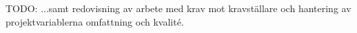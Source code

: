 TODO: ...samt redovisning av arbete med krav mot kravställare och hantering av projektvariablerna omfattning och kvalité.
%
%
